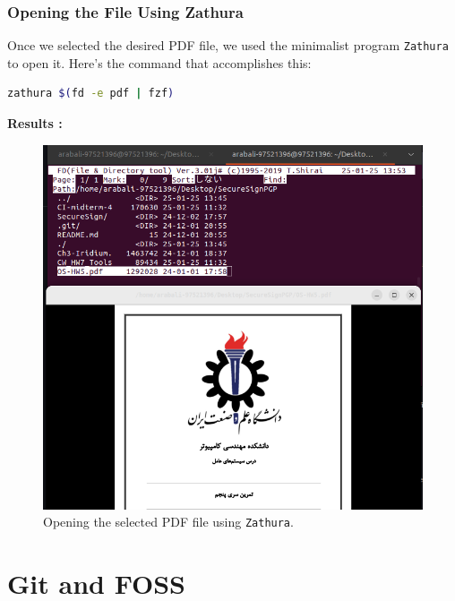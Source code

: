 \documentclass[12pt]{article}
\begin{document}
            \subsubsection{Opening the File Using Zathura}
                
                Once we selected the desired PDF file, we used the minimalist program \texttt{Zathura} to open it. Here’s the command that accomplishes this:
                
                \begin{lstlisting}[language=bash]
                zathura $(fd -e pdf | fzf)
                \end{lstlisting}
                
                \textbf{Results :}
                
                \begin{figure}[H]
                    \centering
                    \includegraphics[width=\textwidth]{assets/pictures/find_and_open_desired_pdf.png}
                    \caption{Opening the selected PDF file using \texttt{Zathura}.}
                \end{figure}
            
                \vspace{1cm}

\section{Git and FOSS}
\end{document}
